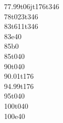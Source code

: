 {{77.99}t{0}{6}jt{17}{6}t{34}{6}\\%
{78}t{0}{23}t{34}{6}\\%
{83}t{6}{11}t{34}{6}\\%
{83}e{40}\\%
{85}b{0}\\%
{85}t{0}{40}\\%
{90}t{0}{40}\\%
{90.01}t{17}{6}\\%
{94.99}t{17}{6}\\%
{95}t{0}{40}\\%
{100}t{0}{40}\\%
{100}e{40}%
}

\def\Tackshape{%
{20}%
{0}b{32}\\%
{0}t{32}{8}\\%
{6}t{32}{8}\\%
{6.01}t{0}{40}\\%
{10.99}t{0}{40}\\%
{11}t{32}{8}\\%
{17}t{32}{8}\\%
{17}e{40}\\%
{19}b{0}\\%
{19}t{0}{34}\\%
{24}t{0}{40}\\%
{24.01}t{17}{6}st{34}{6}\\%
{28.99}t{17}{6}jt{34}{6}\\%
{29}t{0}{40}\\%
{34}t{0}{34}\\%
{34}e{34}\\%
{36}b{6}\\%
{36}t{6}{28}\\%
{41}t{0}{40}\\%
{41.01}t{0}{10}st{30}{10}\\%
{46}t{0}{6}t{34}{6}\\%
{51}t{3}{6}t{31}{6}\\%
{51}e{37}\\%
{53}b{0}\\%
{53}t{0}{40}\\%
{58}t{0}{40}\\%
{58.01}t{15}{10}\\%
{63.99}t{0}{40}\\%
{64}t{0}{17}st{23}{17}\\%
{69}t{0}{6}t{34}{6}\\%
{69}e{40}%
}
